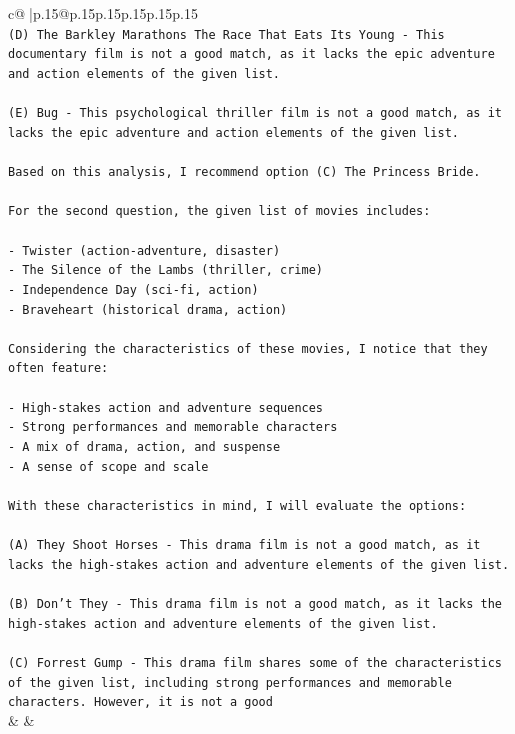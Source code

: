 \documentclass{article}
\begin{document}
{\begin{supertabular}{c@{$\;$}|p{.15\linewidth}@{}p{.15\linewidth}p{.15\linewidth}p{.15\linewidth}p{.15\linewidth}p{.15\linewidth}}
{{{\\ 
\texttt{(D) The Barkley Marathons The Race That Eats Its Young {-} This documentary film is not a good match, as it lacks the epic adventure and action elements of the given list.} \\
\\ 
\texttt{(E) Bug {-} This psychological thriller film is not a good match, as it lacks the epic adventure and action elements of the given list.} \\
\\ 
\texttt{Based on this analysis, I recommend option (C) The Princess Bride.} \\
\\ 
\texttt{For the second question, the given list of movies includes:} \\
\\ 
\texttt{{-} Twister (action{-}adventure, disaster)} \\
\texttt{{-} The Silence of the Lambs (thriller, crime)} \\
\texttt{{-} Independence Day (sci{-}fi, action)} \\
\texttt{{-} Braveheart (historical drama, action)} \\
\\ 
\texttt{Considering the characteristics of these movies, I notice that they often feature:} \\
\\ 
\texttt{{-} High{-}stakes action and adventure sequences} \\
\texttt{{-} Strong performances and memorable characters} \\
\texttt{{-} A mix of drama, action, and suspense} \\
\texttt{{-} A sense of scope and scale} \\
\\ 
\texttt{With these characteristics in mind, I will evaluate the options:} \\
\\ 
\texttt{(A) They Shoot Horses {-} This drama film is not a good match, as it lacks the high{-}stakes action and adventure elements of the given list.} \\
\\ 
\texttt{(B) Don't They {-} This drama film is not a good match, as it lacks the high{-}stakes action and adventure elements of the given list.} \\
\\ 
\texttt{(C) Forrest Gump {-} This drama film shares some of the characteristics of the given list, including strong performances and memorable characters. However, it is not a good} \\
            }
        }
    }
    & & \\ \\


\end{supertabular}}
\end{document}
